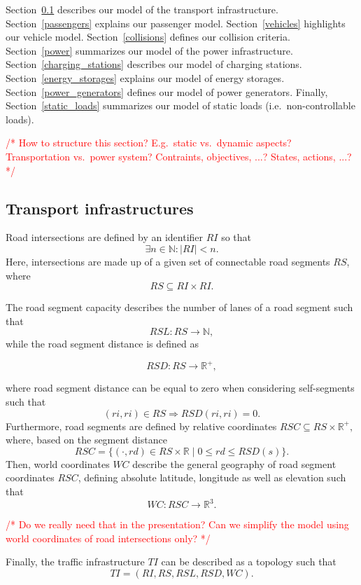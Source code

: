 \documentclass[conference]{IEEEtran}
\newcommand{\todo}[1]{\textcolor{red}{/* #1 */}}
\begin{document}
	Section~\ref{transport} describes our model of the transport infrastructure. Section~\ref{passengers} explains our passenger model. Section~\ref{vehicles} highlights our vehicle model. Section~\ref{collisions} defines our collision criteria. Section~\ref{power} summarizes our model of the power infrastructure. Section~\ref{charging_stations} describes our model of charging stations. Section~\ref{energy_storages} explains our model of energy storages. Section~\ref{power_generators} defines our model of power generators. Finally, Section~\ref{static_loads} summarizes our model of static loads (i.e.\ non-controllable loads).
	
	\todo{How to structure this section? E.g.\ static vs.\ dynamic aspects? Transportation vs.\ power system? Contraints, objectives, ...? States, actions, ...?}
	
	\subsection{Transport infrastructures}
	\label{transport}
	Road intersections are defined by an identifier $RI$ so that
	\[
	\exists n \in \mathbb{N} : |RI| < n \mathrm{.}
	\]
	Here, intersections are made up of a given set of connectable road segments $RS$, where
	\[
	RS \subseteq RI \times RI \mathrm{.}
	\]
	
	The road segment capacity describes the number of lanes of a road segment such that
	\[
	RSL : RS \rightarrow \mathbb{N} \mathrm{,}
	\]
	while the road segment distance is defined as 
	
	\[
	RSD : RS \rightarrow \mathbb{R}^+ \mathrm{,}
	\]
	
	where road segment distance can be equal to zero when considering self-segments such that
	\[
	(ri, ri) \in RS \Rightarrow  RSD(ri, ri) = 0 \mathrm{.}
	\]
	Furthermore, road segments are defined by relative coordinates $RSC \subseteq RS \times \mathbb{R}^+ \mathrm{,}$ where, based on the segment distance
	\[
	RSC = \{(\cdot, rd) \in RS \times \mathbb{R} \mid 0 \leq rd \leq RSD(s) \} \mathrm{.}
	\]
	Then, world coordinates $WC$ describe the general geography of road segment coordinates $RSC$, defining absolute latitude, longitude as well as elevation such that
	\[
	WC : RSC \rightarrow \mathbb{R}^3 \mathrm{.}
	\]
	
 \todo{Do we really need that in the presentation? Can we simplify the model using world coordinates of road intersections only?}
 
	Finally, the traffic infrastructure $TI$ can be described as a topology such that 
	\[
	TI = (RI, RS, RSL, RSD, WC) \mathrm{.}
	\]
	
\end{document}
